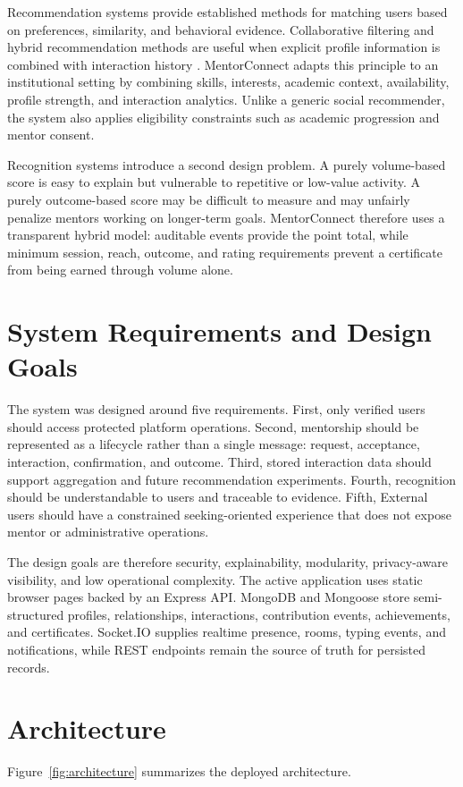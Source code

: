 \documentclass[conference]{IEEEtran}
\begin{document}
Recommendation systems provide established methods for matching users based on preferences, similarity, and behavioral evidence. Collaborative filtering and hybrid recommendation methods are useful when explicit profile information is combined with interaction history \cite{resnick1997,burke2002,ekstrand2011}. MentorConnect adapts this principle to an institutional setting by combining skills, interests, academic context, availability, profile strength, and interaction analytics. Unlike a generic social recommender, the system also applies eligibility constraints such as academic progression and mentor consent.

Recognition systems introduce a second design problem. A purely volume-based score is easy to explain but vulnerable to repetitive or low-value activity. A purely outcome-based score may be difficult to measure and may unfairly penalize mentors working on longer-term goals. MentorConnect therefore uses a transparent hybrid model: auditable events provide the point total, while minimum session, reach, outcome, and rating requirements prevent a certificate from being earned through volume alone.

\section{System Requirements and Design Goals}
The system was designed around five requirements. First, only verified users should access protected platform operations. Second, mentorship should be represented as a lifecycle rather than a single message: request, acceptance, interaction, confirmation, and outcome. Third, stored interaction data should support aggregation and future recommendation experiments. Fourth, recognition should be understandable to users and traceable to evidence. Fifth, External users should have a constrained seeking-oriented experience that does not expose mentor or administrative operations.

The design goals are therefore security, explainability, modularity, privacy-aware visibility, and low operational complexity. The active application uses static browser pages backed by an Express API. MongoDB and Mongoose store semi-structured profiles, relationships, interactions, contribution events, achievements, and certificates. Socket.IO supplies realtime presence, rooms, typing events, and notifications, while REST endpoints remain the source of truth for persisted records.

\section{Architecture}
Figure~\ref{fig:architecture} summarizes the deployed architecture.
\end{document}

